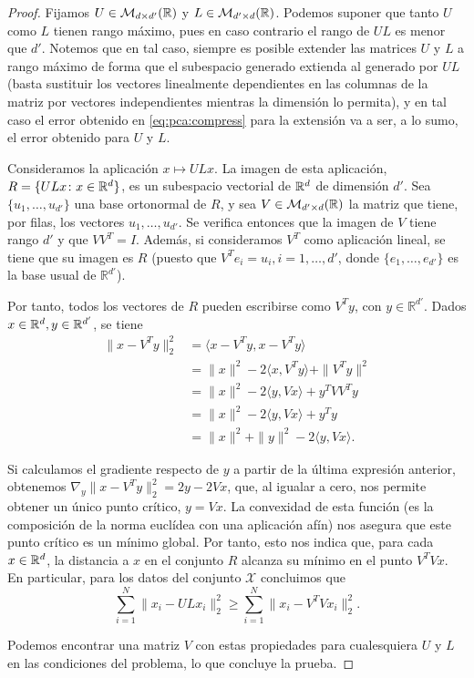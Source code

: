 \begin{proof}
    Fijamos $U \in \mathcal{M}_{d\times d'}(\mathbb{R})$ y $L \in \mathcal{M}_{d'\times d}(\mathbb{R})$. Podemos suponer que tanto $U$ como $L$ tienen rango máximo, pues en caso contrario el rango de $UL$ es menor que $d'$. Notemos que en tal caso, siempre es posible extender las matrices $U$ y $L$ a rango máximo de forma que el subespacio generado extienda al generado por $UL$ (basta sustituir los vectores linealmente dependientes en las columnas de la matriz por vectores independientes mientras la dimensión lo permita), y en tal caso el error obtenido en \ref{eq:pca:compress} para la extensión va a ser, a lo sumo, el error obtenido para $U$ y $L$.

    Consideramos la aplicación $x \mapsto ULx$. La imagen de esta aplicación, $R = \{ ULx \colon x \in \mathbb{R}^d \}$, es un subespacio vectorial de $\mathbb{R}^d$ de dimensión $d'$. Sea $\{u_1,\dots,u_{d'}\}$ una base ortonormal de $R$, y sea $V \in \mathcal{M}_{d'\times d}(\mathbb{R})$ la matriz que tiene, por filas, los vectores $u_1,\dots,u_{d'}$. Se verifica entonces que la imagen de $V$ tiene rango $d'$ y que $VV^T = I$. Además, si consideramos $V^T$ como aplicación lineal, se tiene que su imagen es $R$ (puesto que $V^Te_i = u_i, i = 1,\dots,d'$, donde $\{e_1,\dots,e_{d'}\}$ es la base usual de $\mathbb{R}^{d'}$).

    Por tanto, todos los vectores de $R$ pueden escribirse como $V^Ty$, con $y \in \mathbb{R}^{d'}$. Dados $x \in \mathbb{R}^d, y \in \mathbb{R}^{d'}$, se tiene
    \begin{align*}
    \|x-V^Ty\|_2^2 &= \langle x- V^Ty, x - V^Ty \rangle \\
                   &= \|x\|^2 - 2\langle x,V^T y\rangle + \|V^Ty\|^2 \\
                   &= \|x\|^2 - 2\langle y,Vx \rangle + y^TVV^Ty \\
                   &= \|x\|^2 - 2\langle y,Vx \rangle + y^Ty \\
                   &= \|x\|^2 + \|y\|^2 - 2 \langle y,Vx \rangle.
    \end{align*}

    Si calculamos el gradiente respecto de $y$ a partir de la última expresión anterior, obtenemos $\nabla_y \|x-V^Ty\|_2^2 = 2y - 2Vx$, que, al igualar a cero, nos permite obtener un único punto crítico, $y = Vx$. La convexidad de esta función (es la composición de la norma euclídea con una aplicación afín) nos asegura que este punto crítico es un mínimo global. Por tanto, esto nos indica que, para cada $x \in \mathbb{R}^d$, la distancia a $x$ en el conjunto $R$ alcanza su mínimo en el punto $V^TVx$. En particular, para los datos del conjunto $\mathcal{X}$ concluimos que
    \[ \sum_{i=1}^N \|x_i - ULx_i\|_2^2 \ge \sum_{i=1}^N\|x_i - V^TV x_i\|^2_2. \]

    Podemos encontrar una matriz $V$ con estas propiedades para cualesquiera $U$ y $L$ en las condiciones del problema, lo que concluye la prueba.
\end{proof}

